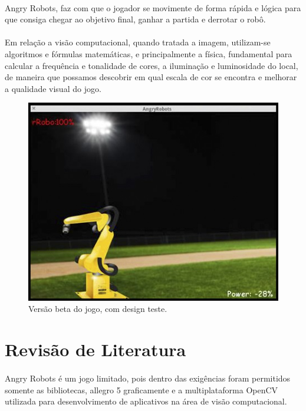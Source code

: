 \documentclass{sciposter}
\begin{document}
\begin{multicols}{3}
\paragraph{}Angry Robots, faz com que o jogador se movimente de forma rápida e lógica para que consiga chegar ao objetivo final, ganhar a partida e derrotar o robô.
\paragraph{}Em relação a visão computacional, quando tratada a imagem, utilizam-se algoritmos e fórmulas matemáticas, e principalmente a física, fundamental para calcular a frequência e tonalidade de cores, a iluminação e luminosidade do local, de maneira que possamos descobrir em qual escala de cor se encontra e melhorar a qualidade visual do jogo.

\begin{figure}[!htb]
\centering
\includegraphics[scale=1.4]{betateste.jpg}
\caption{Versão beta do jogo, com design teste.}
\end{figure}

\vspace{0.7cm}

\newcommand{\imsize}{0.45\columnwidth}

\section{Revisão de Literatura}
\paragraph{}Angry Robots é um jogo limitado, pois dentro das exigências foram permitidos somente as bibliotecas, allegro 5 graficamente e a multiplataforma OpenCV utilizada para desenvolvimento de aplicativos na área de visão computacional.

\end{multicols}
\end{document}
